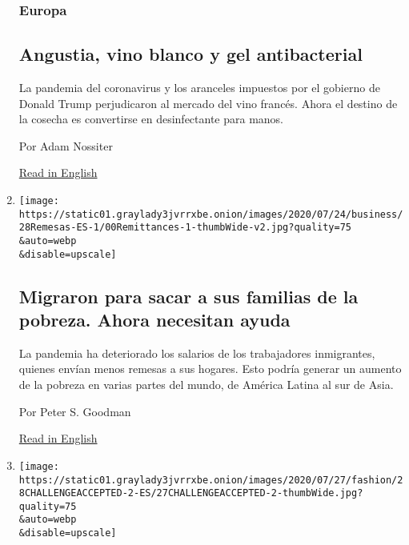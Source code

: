 \begin{enumerate}
  \hypertarget{europa}{%
  \subsubsection{Europa}\label{europa}}

  \hypertarget{angustia-vino-blanco-y-gel-antibacterial}{%
  \subsection{Angustia, vino blanco y gel
  antibacterial}\label{angustia-vino-blanco-y-gel-antibacterial}}

  La pandemia del coronavirus y los aranceles impuestos por el gobierno
  de Donald Trump perjudicaron al mercado del vino francés. Ahora el
  destino de la cosecha es convertirse en desinfectante para manos.

  Por Adam Nossiter

  \href{https://www.nytimes3xbfgragh.onion/2020/07/27/world/europe/france-alsace-wine-coronavirus.html}{Read
  in English}
\item
  \href{/es/2020/07/28/espanol/mundo/remesas-coronavirus.html}{}

  \texttt{[image: https://static01.graylady3jvrrxbe.onion/images/2020/07/24/business/28Remesas-ES-1/00Remittances-1-thumbWide-v2.jpg?quality=75\\\&auto=webp\\\&disable=upscale]}

  \hypertarget{migraron-para-sacar-a-sus-familias-de-la-pobreza-ahora-necesitan-ayuda}{%
  \subsection{Migraron para sacar a sus familias de la pobreza. Ahora
  necesitan
  ayuda}\label{migraron-para-sacar-a-sus-familias-de-la-pobreza-ahora-necesitan-ayuda}}

  La pandemia ha deteriorado los salarios de los trabajadores
  inmigrantes, quienes envían menos remesas a sus hogares. Esto podría
  generar un aumento de la pobreza en varias partes del mundo, de
  América Latina al sur de Asia.

  Por Peter S. Goodman

  \href{https://www.nytimes3xbfgragh.onion/2020/07/27/business/global-remittances-coronavirus.html}{Read
  in English}
\item
  \href{/es/2020/07/28/espanol/estilos-de-vida/reto-selfi-blanco-negro.html}{}

  \texttt{[image: https://static01.graylady3jvrrxbe.onion/images/2020/07/27/fashion/28CHALLENGEACCEPTED-2-ES/27CHALLENGEACCEPTED-2-thumbWide.jpg?quality=75\\\&auto=webp\\\&disable=upscale]}


\end{enumerate}
